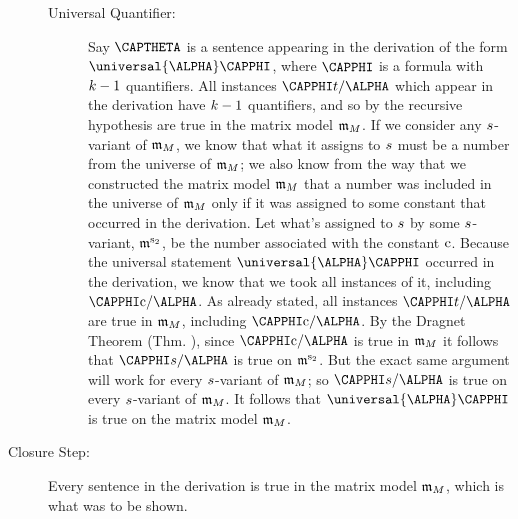 \begin{PROOF}
\begin{description}
\begin{description}
\item[Universal Quantifier:]
Say $\CAPTHETA$ is a sentence appearing in the derivation of the form $\universal{\ALPHA}\CAPPHI$, where $\CAPPHI$ is a formula with $k-1$ quantifiers. 
All instances $\CAPPHI\variable{t}/\ALPHA$ which appear in the derivation have $k-1$ quantifiers, and so by the recursive hypothesis are true in the matrix model $\mathfrak{m}_M$. 
If we consider any $s$-variant of $\mathfrak{m}_M$, we know that what it assigns to $s$ must be a number from the universe of $\mathfrak{m}_M$;
we also know from the way that we constructed the matrix model $\mathfrak{m}_M$ that a number was included in the universe of $\mathfrak{m}_M$ only if it was assigned to some constant that occurred in the derivation.  
Let what's assigned to $s$ by some $s$-variant, $\mathfrak{m^{\mathrm{s_2}}_{\mathrm{}}}$, be the number associated with the constant $\mathrm{c}$.
Because the universal statement $\universal{\ALPHA}\CAPPHI$ occurred in the derivation, we know that we took all instances of it, including $\CAPPHI\constant{c}/\ALPHA$. 
As already stated, all instances $\CAPPHI\variable{t}/\ALPHA$ are true in $\mathfrak{m}_M$, including $\CAPPHI\constant{c}/\ALPHA$.
By the Dragnet Theorem (Thm. ), since $\CAPPHI\constant{c}/\ALPHA$ is true in $\mathfrak{m}_M$ it follows that $\CAPPHI\variable{s}/\ALPHA$ is true on $\mathfrak{m^{\mathrm{s_2}}_{\mathrm{}}}$. 
But the exact same argument will work for every $s$-variant of $\mathfrak{m}_M$; so $\CAPPHI\variable{s}/\ALPHA$ is true on every $s$-variant of $\mathfrak{m}_M$. 
It follows that $\universal{\ALPHA}\CAPPHI$ is true on the matrix model $\mathfrak{m}_M$. 
\end{description}

\item[Closure Step:]
Every sentence in the derivation is true in the matrix model $\mathfrak{m}_M$, which is what was to be shown. 
\end{description}
\end{PROOF}

